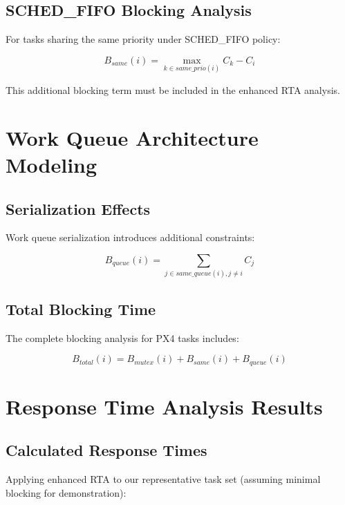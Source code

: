 \documentclass[12pt,a4paper]{article}
\begin{document}
\subsection{SCHED\_FIFO Blocking Analysis}

For tasks sharing the same priority under SCHED\_FIFO policy:

\begin{equation}
B_{same}(i) = \max_{k \in same\_prio(i)} C_k - C_i
\end{equation}

This additional blocking term must be included in the enhanced RTA analysis.

\section{Work Queue Architecture Modeling}

\subsection{Serialization Effects}

Work queue serialization introduces additional constraints:

\begin{equation}
B_{queue}(i) = \sum_{j \in same\_queue(i), j \neq i} C_j
\end{equation}

\subsection{Total Blocking Time}

The complete blocking analysis for PX4 tasks includes:

\begin{equation}
B_{total}(i) = B_{mutex}(i) + B_{same}(i) + B_{queue}(i)
\end{equation}

\section{Response Time Analysis Results}

\subsection{Calculated Response Times}

Applying enhanced RTA to our representative task set (assuming minimal blocking for demonstration):
\end{document}
